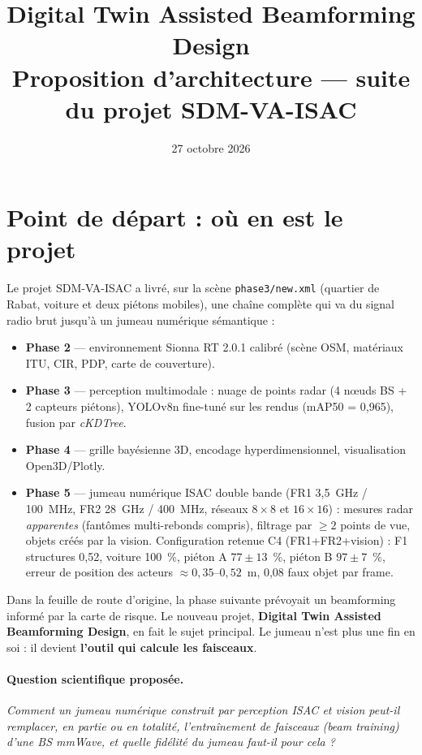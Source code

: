 \documentclass[11pt,a4paper]{article}
\title{\textbf{Digital Twin Assisted Beamforming Design}\\[4pt]
\large Proposition d'architecture --- suite du projet SDM-VA-ISAC}
\author{}
\date{27 octobre 2026}
\begin{document}
\maketitle
\vspace{-1.2cm}
\tableofcontents
\newpage

\section{Point de départ : où en est le projet}

Le projet SDM-VA-ISAC a livré, sur la scène \texttt{phase3/new.xml} (quartier de Rabat, voiture
et deux piétons mobiles), une chaîne complète qui va du signal radio brut jusqu'à un jumeau
numérique sémantique :

\begin{itemize}
  \item \textbf{Phase 2} --- environnement Sionna RT 2.0.1 calibré (scène OSM, matériaux ITU, CIR,
        PDP, carte de couverture).
  \item \textbf{Phase 3} --- perception multimodale : nuage de points radar (4 n\oe uds BS + 2
        capteurs piétons), YOLOv8n fine-tuné sur les rendus (mAP50 = 0,965), fusion par
        \textit{cKDTree}.
  \item \textbf{Phase 4} --- grille bayésienne 3D, encodage hyperdimensionnel, visualisation
        Open3D/Plotly.
  \item \textbf{Phase 5} --- jumeau numérique ISAC double bande (FR1 3,5~GHz / 100~MHz, FR2
        28~GHz / 400~MHz, réseaux $8\times8$ et $16\times16$) : mesures radar \emph{apparentes}
        (fantômes multi-rebonds compris), filtrage par $\geq 2$ points de vue, objets créés par la
        vision. Configuration retenue C4 (FR1+FR2+vision) : F1 structures 0,52, voiture 100~\%,
        piéton A $77\pm13$~\%, piéton B $97\pm7$~\%, erreur de position des acteurs
        $\approx 0{,}35$--$0{,}52$~m, 0,08 faux objet par frame.
\end{itemize}

Dans la feuille de route d'origine, la phase suivante prévoyait un \og beamforming informé \fg{}
par la carte de risque. Le nouveau projet, \textbf{Digital Twin Assisted Beamforming Design}, en
fait le sujet principal. Le jumeau n'est plus une fin en soi : il devient \textbf{l'outil qui
calcule les faisceaux}.

\paragraph{Question scientifique proposée.}
\emph{Comment un jumeau numérique construit par perception ISAC et vision peut-il remplacer, en
partie ou en totalité, l'entraînement de faisceaux (\textit{beam training}) d'une BS mmWave, et
quelle fidélité du jumeau faut-il pour cela ?}
\end{document}
